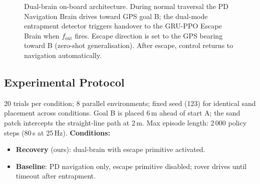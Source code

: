 \documentclass[conference]{IEEEtran}
\begin{document}
\begin{figure}[t]
{%
  }
  \caption{Dual-brain on-board architecture. During normal traversal the PD
    Navigation Brain drives toward GPS goal B; the dual-mode entrapment detector
    triggers handover to the GRU-PPO Escape Brain when $f_\text{ent}$ fires. Escape direction is set to the GPS bearing toward B (zero-shot
    generalisation). After escape, control returns to navigation automatically.}
  \label{fig:dual_brain}
\end{figure}

\subsection{Experimental Protocol}

20 trials per condition; 8 parallel environments; fixed seed (123) for
identical sand placement across conditions. Goal B is placed 6\,m ahead of
start A; the sand patch intercepts the straight-line path at 2\,m.
Max episode length: 2\,000 policy steps (80\,s at 25\,Hz). \textbf{Conditions:}
\begin{itemize}
  \item \textbf{Recovery} (ours): dual-brain with escape primitive activated.
  \item \textbf{Baseline}: PD navigation only, escape primitive disabled; rover
        drives until timeout after entrapment.
\end{itemize}
\end{document}
